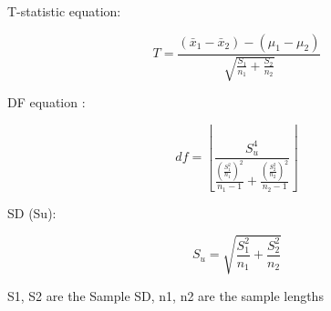 \documentclass[11pt]{article}
\begin{document}
T-statistic equation:

\begin{equation*} T = \frac{(\bar x_1 - \bar x_2) - (\mu _1 - \mu _2)} {\sqrt {\frac {S_1}{n_1} + \frac {S_2} {n_2}}} \end{equation*}

DF equation :

\begin{equation*} df = \left \lfloor{\frac{S_u ^ 4} {\frac{( \frac{S_1 ^ 2}{n_1} )^2}{n_1 - 1} + {\frac{( \frac{S_2 ^ 2}{n_2} )^2}{n_2 - 1}}}} \right \rfloor\end{equation*}

SD (Su):

\begin{equation*} S_u = \sqrt{\frac{S_1 ^ 2}{n_1} + \frac{S_2 ^ 2}{n_2}}  \end{equation*}

S1, S2 are the Sample SD, n1, n2 are the sample lengths
\end{document}
